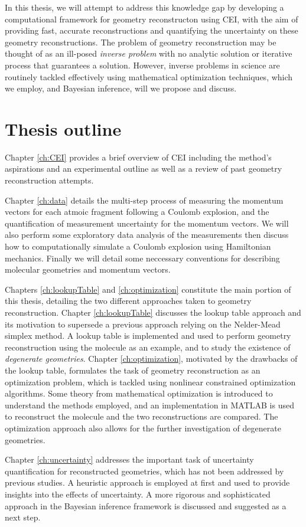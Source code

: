 In this thesis, we will attempt to address this knowledge gap by developing a computational framework for geometry reconstructon using CEI, with the aim of providing fast, accurate reconstructions and quantifying the uncertainty on these geometry reconstructions. The problem of geometry reconstruction may be thought of as an ill-posed \emph{inverse problem} with no analytic solution or iterative process that guarantees a solution. However, inverse problems in science are routinely tackled effectively using mathematical optimization techniques, which we employ, and Bayesian inference, will we propose and discuss.

\section*{Thesis outline}
Chapter \ref{ch:CEI} provides a brief overview of CEI including the method's aspirations and an experimental outline as well as a review of past geometry reconstruction attempts.

Chapter \ref{ch:data} details the multi-step process of measuring the momentum vectors for each atmoic fragment following a Coulomb explosion, and the quantification of measurement uncertainty for the momentum vectors. We will also perform some exploratory data analysis of the measurements then discuss how to computationally simulate a Coulomb explosion using Hamiltonian mechanics. Finally we will detail some neccessary conventions for describing molecular geometries and momentum vectors.

Chapters \ref{ch:lookupTable} and \ref{ch:optimization} constitute the main portion of this thesis, detailing the two different approaches taken to geometry reconstruction. Chapter \ref{ch:lookupTable} discusses the lookup table approach and its motivation to supersede a previous approach relying on the Nelder-Mead simplex method. A lookup table is implemented and used to perform geometry reconstruction using the  molecule as an example, and to study the existence of \emph{degenerate geometries}. Chapter \ref{ch:optimization}, motivated by the drawbacks of the lookup table, formulates the task of geometry reconstruction as an optimization problem, which is tackled using nonlinear constrained optimization algorithms. Some theory from mathematical optimization is introduced to understand the methods employed, and an implementation in MATLAB is used to reconstruct the  molecule and the two reconstructions are compared. The optimization approach also allows for the further investigation of degenerate geometries.

Chapter \ref{ch:uncertainty} addresses the important task of uncertainty quantification for reconstructed geometries, which has not been addressed by previous studies. A heuristic approach is employed at first and used to provide insights into the effects of uncertainty. A more rigorous and sophisticated approach in the Bayesian inference framework is discussed and suggested as a next step.